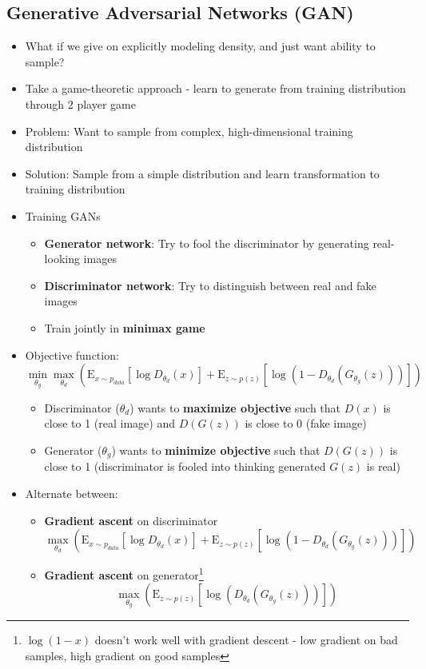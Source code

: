 \subsection{Generative Adversarial Networks (GAN)}
\begin{itemize}
	\item What if we give on explicitly modeling density, and just want ability to sample?
	\item Take a game-theoretic approach - learn to generate from training distribution through 2 player game
	\item Problem: Want to sample from complex, high-dimensional training distribution
	\item Solution: Sample from a simple distribution and learn transformation to training distribution
	\item Training GANs
	\begin{itemize}
		\item \textbf{Generator network}: Try to fool the discriminator by generating real-looking images
		\item \textbf{Discriminator network}: Try to distinguish between real and fake images
		\item Train jointly in \textbf{minimax game}
	\end{itemize}
	\item Objective function:
	$$\min_{\theta_g} \max_{\theta_d}\left( \mathrm{E}_{x\sim p_{data}}\left[\log D_{\theta_d}(x)\right] + \mathrm{E}_{z\sim p(z)} \left[\log(1-D_{\theta_d}(G_{\theta_g}(z)))\right]\right)$$
	\begin{itemize}
		\item Discriminator ($\theta_d$) wants to \textbf{maximize objective} such that $D(x)$ is close to 1 (real image) and $D(G(z))$ is close to 0 (fake image)
		\item Generator ($\theta_g$) wants to \textbf{minimize objective} such that $D(G(z))$ is close to 1 (discriminator is fooled into thinking generated $G(z)$ is real)
	\end{itemize}
	\item Alternate between:
	\begin{itemize}
		\item \textbf{Gradient ascent} on discriminator $$\max_{\theta_d}\left( \mathrm{E}_{x\sim p_{data}}\left[\log D_{\theta_d}(x)\right] + \mathrm{E}_{z\sim p(z)} \left[\log(1-D_{\theta_d}(G_{\theta_g}(z)))\right]\right)$$
		\item \textbf{Gradient ascent} on generator\footnote{$\log(1-x)$ doesn't work well with gradient descent - low gradient on bad samples, high gradient on good samples} $$\max_{\theta_g} \left(\mathrm{E}_{z\sim p(z)} \left[\log(D_{\theta_d}(G_{\theta_g}(z)))\right]\right)$$

\end{itemize}
\end{itemize}
